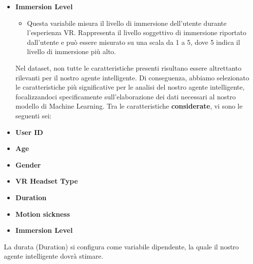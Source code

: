 {\begin{itemize}
\begin{itemize}
    \end{itemize}
  \item \textbf{Immersion Level}
    \begin{itemize}
      \item Questa variabile misura il livello di immersione dell'utente durante l'esperienza VR. Rappresenta il livello soggettivo di immersione riportato dall'utente e può essere misurato su una scala da 1 a 5, dove 5 indica il livello di immersione più alto.
    \end{itemize}
    \newline
        \newline
    Nel dataset, non tutte le caratteristiche presenti risultano essere altrettanto rilevanti per il nostro agente intelligente. Di conseguenza, abbiamo selezionato le caratteristiche più significative per le analisi del nostro agente intelligente, focalizzandoci specificamente sull'elaborazione dei dati necessari al nostro modello di Machine Learning. 
    \newline
    Tra le caratteristiche  \textbf{considerate}, vi sono le seguenti sei:
    \item \textbf{User ID}
    \item \textbf{Age}
    \item \textbf{Gender}
    \item \textbf{VR Headset Type}
    \item \textbf{Duration}
    \item \textbf{Motion sickness}
    \item \textbf{Immersion Level}
    \end{itemize}
    La durata (Duration) si configura come variabile dipendente, la quale il nostro agente intelligente dovrà stimare.
}